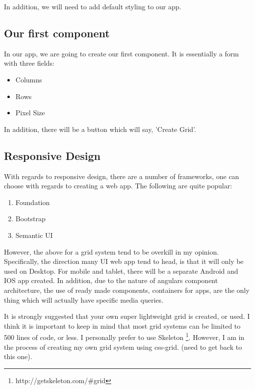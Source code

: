In addition, we will need to add default styling to our app.

\subsection{ Our first component }
In our app, we are going to create our first component. It is essentially a form
with three fields:
\begin{itemize}
  \item Columns
  \item Rows
  \item Pixel Size
\end{itemize}

In addition, there will be a button which will say, 'Create Grid'.


\subsection{ Responsive Design }
With regards to responsive design, there are a number of frameworks, one can
choose with regards to creating a web app. The following are quite popular:
\begin{enumerate}
  \item Foundation
  \item Bootstrap
  \item Semantic UI
\end{enumerate}

However, the above for a grid system tend to be overkill in my opinion.
Specifically, the direction many UI web app tend to head, is that it will only
be used on Desktop. For mobile and tablet, there will be a separate Android and
IOS app created. In addition, due to the nature of angulars component
architecture, the use of ready made components, containers for apps, are the
only thing which will actually have specific media queries.

It is strongly suggested that your own super lightweight grid is created, or
used. I think it is important to keep in mind that most grid systems can be
limited to 500 lines of code, or less. I personally prefer to use Skeleton
\footnote{http://getskeleton.com/\#grid}. However, I am in the process of
creating my own grid system using css-grid. (need to get back to this one).
